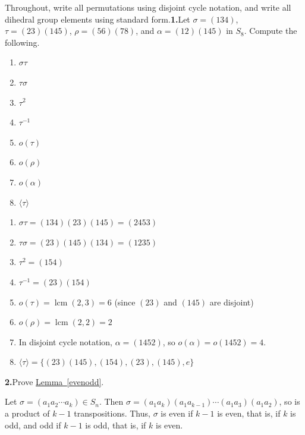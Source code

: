 \documentclass[10pt,]{book}
\theoremstyle{plain}
\theoremstyle{definition}
\theoremstyle{definition}
\theoremstyle{definition}
\theoremstyle{definition}
\numberwithin{equation}{section}
\DeclareMathOperator{\lcm}{lcm}
\begin{document}
Throughout, write all permutations using disjoint cycle notation, and write all dihedral group elements using standard form.\noindent\textbf{1.}\quad{}Let \(\sigma=(134)\), \(\tau=(23)(145)\), \(\rho=(56)(78)\), and \(\alpha=(12)(145)\) in \(S_8\). Compute the following. \leavevmode%
\begin{multicols}{4}
\begin{enumerate}[label=(\alph*)]
\item\hypertarget{li-363}{}\(\sigma \tau\)%
\item\hypertarget{li-364}{}\(\tau \sigma\)%
\item\hypertarget{li-365}{}\(\tau^2\)%
\item\hypertarget{li-366}{}\(\tau^{-1}\)%
\item\hypertarget{li-367}{}\(o(\tau)\)%
\item\hypertarget{li-368}{}\(o(\rho)\)%
\item\hypertarget{li-369}{}\(o(\alpha)\)%
\item\hypertarget{li-370}{}\(\langle \tau\rangle\)%
\end{enumerate}
\end{multicols}
%
\par\smallskip
\leavevmode%
\begin{enumerate}[label=(\alph*)]
\item\hypertarget{li-371}{}\(\sigma \tau= (134)(23)(145)=(2453)\)%
\item\hypertarget{li-372}{}\(\tau \sigma=  (23)(145)(134)=(1235)\)%
\item\hypertarget{li-373}{}\(\tau^2=(154)\)%
\item\hypertarget{li-374}{}\(\tau^{-1}=(23)(154)\)%
\item\hypertarget{li-375}{}\(o(\tau)=\lcm(2,3)=6\) (since \((23)\) and \((145)\) are disjoint)%
\item\hypertarget{li-376}{}\(o(\rho)=\lcm(2,2)=2\)%
\item\hypertarget{li-377}{}In disjoint cycle notation, \(\alpha=(1452)\), so \(o(\alpha)=o(1452)=4\).%
\item\hypertarget{li-378}{}\(\langle \tau\rangle =\{(23)(145), (154), (23), (145), e\}\)%
\end{enumerate}
\par\smallskip
\noindent\textbf{2.}\quad{}Prove \hyperref[evenodd]{Lemma~\ref{evenodd}}.%
\par\smallskip
Let \(\sigma=(a_1a_2\cdots a_k)\in S_n\). Then \(\sigma=(a_1a_k)(a_1a_{k-1})\cdots (a_1a_3)(a_1a_2)\), so is a product of \(k-1\) transpositions. Thus, \(\sigma\) is even if \(k-1\) is even, that is, if \(k\) is odd, and odd if \(k-1\) is odd, that is, if \(k\) is even.%
\end{document}
